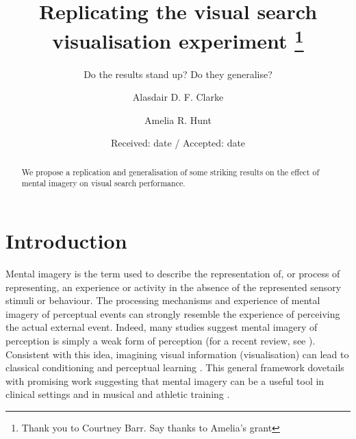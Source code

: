 \documentclass[smallextended]{svjour3}       %
\begin{document}
\title{Replicating the visual search visualisation experiment
\thanks{Thank you to Courtney Barr. Say thanks to Amelia's grant}}

\subtitle{Do the results stand up? Do they generalise?}


\author{Alasdair D. F. Clarke         \and
        Amelia R. Hunt
}



\date{Received: date / Accepted: date}


\maketitle

\begin{abstract}
We propose a replication and generalisation of some striking results on the effect of mental imagery on visual search performance. 
\end{abstract}

\section{Introduction}
\label{sec:intro}

Mental imagery is the term used to describe the representation of, or process of representing, an experience or activity in the absence of the represented sensory stimuli or behaviour. The processing mechanisms and experience of mental imagery of perceptual events can strongly resemble the experience of perceiving the actual external event. Indeed, many studies suggest mental imagery of perception is simply a weak form of perception (for a recent review, see \cite{pearson2015}). Consistent with this idea, imagining visual information (visualisation) can lead to classical conditioning \citep{lewis2013} and perceptual learning \citep{tartaglia2009}. This general framework dovetails with promising work suggesting that mental imagery can be a useful tool in clinical settings \citep[e.g.][]{foa1980} and in musical and athletic training \citep[e.g.][]{zatorre2007, guillot2008}. 
\end{document}

